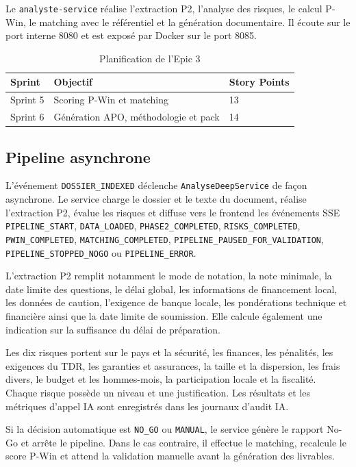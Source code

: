 Le \texttt{analyste-service} réalise l’extraction P2, l’analyse des risques, le calcul P-Win, le matching avec le référentiel et la génération documentaire. Il écoute sur le port interne 8080 et est exposé par Docker sur le port 8085.

\begin{table}[H]
\centering
\caption{Planification de l’Epic 3}
\begin{tabular}{lll}
\toprule
\textbf{Sprint} & \textbf{Objectif} & \textbf{Story Points} \\
\midrule
Sprint 5 & Scoring P-Win et matching & 13 \\
Sprint 6 & Génération APO, méthodologie et pack & 14 \\
\bottomrule
\end{tabular}
\end{table}

\subsection{Pipeline asynchrone}

L’événement \texttt{DOSSIER\_INDEXED} déclenche \texttt{AnalyseDeepService} de façon asynchrone. Le service charge le dossier et le texte du document, réalise l’extraction P2, évalue les risques et diffuse vers le frontend les événements SSE \texttt{PIPELINE\_START}, \texttt{DATA\_LOADED}, \texttt{PHASE2\_COMPLETED}, \texttt{RISKS\_COMPLETED}, \texttt{PWIN\_COMPLETED}, \texttt{MATCHING\_COMPLETED}, \texttt{PIPELINE\_PAUSED\_FOR\_VALIDATION}, \texttt{PIPELINE\_STOPPED\_NOGO} ou \texttt{PIPELINE\_ERROR}.

L’extraction P2 remplit notamment le mode de notation, la note minimale, la date limite des questions, le délai global, les informations de financement local, les données de caution, l’exigence de banque locale, les pondérations technique et financière ainsi que la date limite de soumission. Elle calcule également une indication sur la suffisance du délai de préparation.

Les dix risques portent sur le pays et la sécurité, les finances, les pénalités, les exigences du TDR, les garanties et assurances, la taille et la dispersion, les frais divers, le budget et les hommes-mois, la participation locale et la fiscalité. Chaque risque possède un niveau et une justification. Les résultats et les métriques d’appel IA sont enregistrés dans les journaux d’audit IA.

Si la décision automatique est \texttt{NO\_GO} ou \texttt{MANUAL}, le service génère le rapport No-Go et arrête le pipeline. Dans le cas contraire, il effectue le matching, recalcule le score P-Win et attend la validation manuelle avant la génération des livrables.

